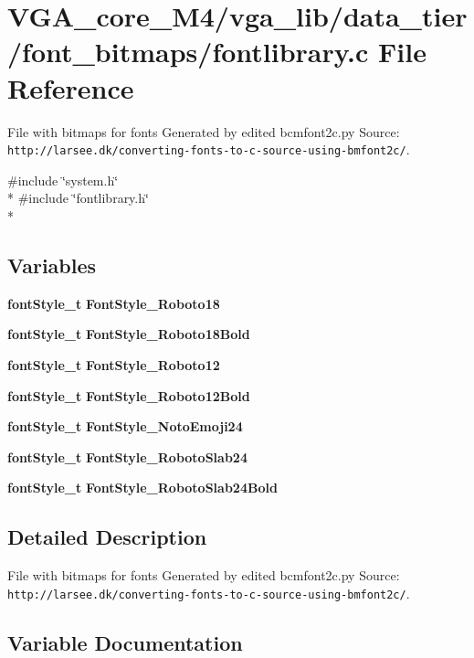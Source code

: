 \section{V\+G\+A\+\_\+core\+\_\+\+M4/vga\+\_\+lib/data\+\_\+tier/font\+\_\+bitmaps/fontlibrary.c File Reference}
\label{fontlibrary_8c}


File with bitmaps for fonts Generated by edited bcmfont2c.\+py Source\+: {\tt http\+://larsee.\+dk/converting-\/fonts-\/to-\/c-\/source-\/using-\/bmfont2c/}.  


{\ttfamily \#include \char`\"{}system.\+h\char`\"{}}\\*
{\ttfamily \#include \char`\"{}fontlibrary.\+h\char`\"{}}\\*
\subsection*{Variables}
\begin{DoxyCompactItemize}
\item 
{\bf font\+Style\+\_\+t} {\bfseries Font\+Style\+\_\+\+Roboto18}
\item 
{\bf font\+Style\+\_\+t} {\bfseries Font\+Style\+\_\+\+Roboto18\+Bold}
\item 
{\bf font\+Style\+\_\+t} {\bfseries Font\+Style\+\_\+\+Roboto12}
\item 
{\bf font\+Style\+\_\+t} {\bfseries Font\+Style\+\_\+\+Roboto12\+Bold}
\item 
{\bf font\+Style\+\_\+t} {\bfseries Font\+Style\+\_\+\+Noto\+Emoji24}
\item 
{\bf font\+Style\+\_\+t} {\bfseries Font\+Style\+\_\+\+Roboto\+Slab24}
\item 
{\bf font\+Style\+\_\+t} {\bfseries Font\+Style\+\_\+\+Roboto\+Slab24\+Bold}
\end{DoxyCompactItemize}


\subsection{Detailed Description}
File with bitmaps for fonts Generated by edited bcmfont2c.\+py Source\+: {\tt http\+://larsee.\+dk/converting-\/fonts-\/to-\/c-\/source-\/using-\/bmfont2c/}. 



\subsection{Variable Documentation}
